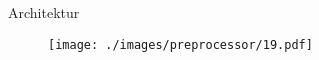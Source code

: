 \begin{frame}{Architektur}
    \begin{figure}
    	\centering
    	\texttt{[image: ./images/preprocessor/19.pdf]}
    \end{figure}
\end{frame}
